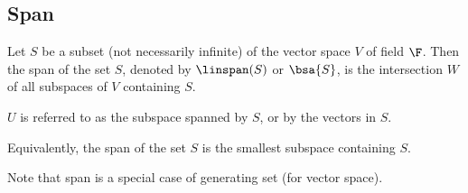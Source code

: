 \subsection{Span}




\begin{definition}[span]
Let $S$ be a subset (not necessarily infinite) of the vector space $V$ of field $\F$. Then the span of the set $S$, denoted by $\linspan(S)$ or $\bsa{S}$, is the intersection $W$ of all subspaces of $V$ containing $S$.

$U$ is referred to as the subspace spanned by $S$, or by the vectors in $S$.

Equivalently, the span of the set $S$ is the smallest subspace containing $S$.
\end{definition}

\begin{remark}
Note that span is a special case of generating set (for vector space).
\end{remark}





